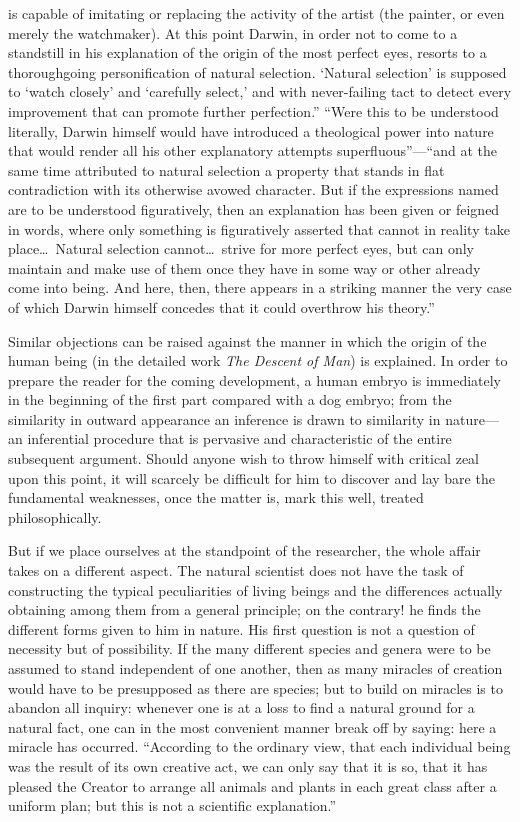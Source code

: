 \documentclass[12pt,a4paper]{article}
\begin{document}
is capable of imitating or replacing the activity of the artist (the
painter, or even merely the watchmaker). At this point Darwin, in
order not to come to a standstill in his explanation of the origin of
the most perfect eyes, resorts to a thoroughgoing personification of
natural selection. `Natural selection' is supposed to `watch closely'
and `carefully select,' and with never-failing tact to detect every
improvement that can promote further perfection.'' ``Were this to be
understood literally, Darwin himself would have introduced a
theological power into nature that would render all his other
explanatory attempts superfluous''---``and at the same time attributed
to natural selection a property that stands in flat contradiction with
its otherwise avowed character. But if the expressions named are to be
understood figuratively, then an explanation has been given or feigned
in words, where only something is figuratively asserted that cannot in
reality take place\ldots\ Natural selection cannot\ldots\ strive for
more perfect eyes, but can only maintain and make use of them once
they have in some way or other already come into being. And here,
then, there appears in a striking manner the very case of which Darwin
himself concedes that it could overthrow his theory.''

Similar objections can be raised against the manner in which the
origin of the human being (in the detailed work \emph{The Descent of
Man}) is explained. In order to prepare the reader for the coming
development, a human embryo is immediately in the beginning of the
first part compared with a dog embryo; from the similarity in outward
appearance an inference is drawn to similarity in nature---an
inferential procedure that is pervasive and characteristic of the
entire subsequent argument. Should anyone wish to throw himself with
critical zeal upon this point, it will scarcely be difficult for him
to discover and lay bare the fundamental weaknesses, once the matter
is, mark this well, treated philosophically.

But if we place ourselves at the standpoint of the researcher, the
whole affair takes on a different aspect. The natural scientist does
not have the task of constructing the typical peculiarities of living
beings and the differences actually obtaining among them from a
general principle; on the contrary! he finds the different forms given
to him in nature. His first question is not a question of necessity
but of possibility. If the many different species and genera were to
be assumed to stand independent of one another, then as many miracles
of creation would have to be presupposed as there are species; but to
build on miracles is to abandon all inquiry: whenever one is at a
loss to find a natural ground for a natural fact, one can in the most
convenient manner break off by saying: here a miracle has occurred.
``According to the ordinary view, that each individual being was the
result of its own creative act, we can only say that it is so, that
it has pleased the Creator to arrange all animals and plants in each
great class after a uniform plan; but this is not a scientific
explanation.''
\end{document}
